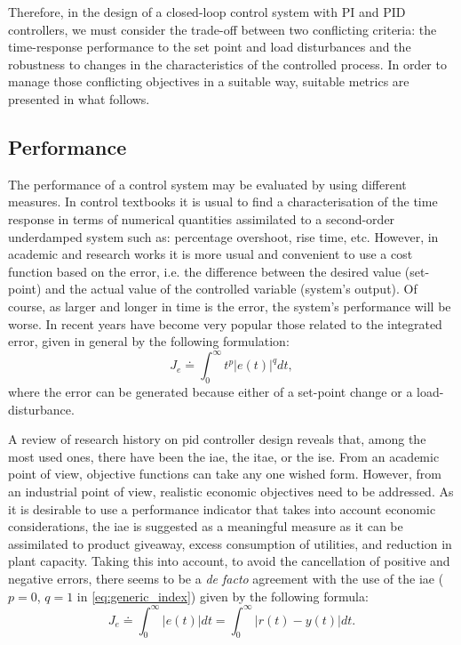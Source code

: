 Therefore, in the design of a closed-loop control system with PI and PID controllers, we must consider the trade-off between two conflicting criteria: the time-response performance to the set point and load disturbances and the robustness to changes in the characteristics of the controlled process. In order to manage those conflicting objectives in a suitable way, suitable metrics are presented in what follows.
 
\subsection{Performance}
%
The performance of a control system may be evaluated by using different measures. In control textbooks it is usual to find a characterisation of the time response in terms of numerical quantities assimilated to a second-order underdamped system such as: percentage overshoot, rise time, etc. However, in academic and research works it is more usual and convenient to use a cost function based on the error, i.e. the difference between the desired value (set-point) and the actual value of the controlled variable (system's output).  Of course, as larger and longer in time is the error, the system's performance will be worse. In recent years have become very popular those related to the integrated error, given in general by the following formulation:
%
\begin{equation}
	J_{e} \doteq \int^{\infty}_{0} t^p \left|e(t)\right|^q dt,  \label{eq:generic_index}
\end{equation}
%
where the error can be generated because either of a set-point change or a load-disturbance.

A review of research history on \gls{pid} controller design reveals that, among the most used ones, there have been the \gls{iae}, the \gls{itae}, or the \gls{ise}. From an academic point of view, objective functions can take any one wished form. However, from an industrial point of view, realistic economic objectives need to be addressed. As it is desirable to use a performance indicator that takes into account economic considerations, the \gls{iae} is suggested \citet{Shinskey2002} as a meaningful measure as it can be assimilated to product giveaway, excess consumption of utilities, and reduction in plant capacity. Taking this into account, to avoid the cancellation of positive and negative errors, there seems to be a \emph{de facto} agreement with the use of the \gls{iae} ($p=0$, $q=1$ in \ref{eq:generic_index}) given by the following formula:
%
\begin{equation}
	J_e \doteq \int^{\infty}_{0} \left|e(t) \right| dt = \int^{\infty}_{0} \left|r(t)-y(t) \right| dt. 
\end{equation}
%
